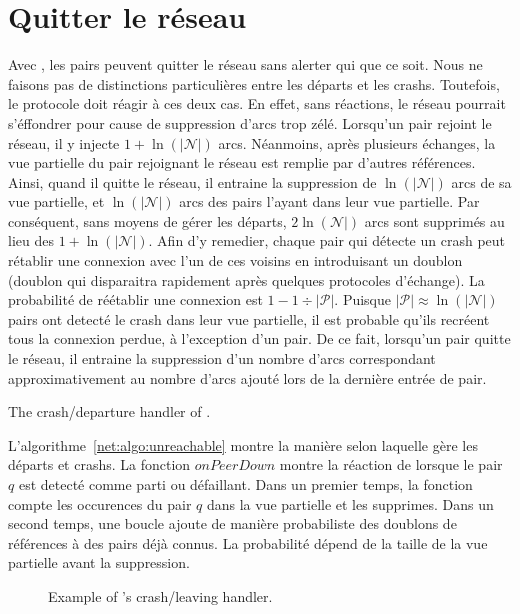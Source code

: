 \section{Quitter le réseau}

Avec \SPRAY, les pairs peuvent quitter le réseau sans alerter qui que ce
soit. Nous ne faisons pas de distinctions particulières entre les départs et les
crashs. Toutefois, le protocole doit réagir à ces deux cas. En effet, sans
réactions, le réseau pourrait s'éffondrer pour cause de suppression d'arcs trop
zélé. Lorsqu'un pair rejoint le réseau, il y injecte $1+\ln(|\mathcal{N}|)$
arcs. Néanmoins, après plusieurs échanges, la vue partielle du pair rejoignant
le réseau est remplie par d'autres références. Ainsi, quand il quitte le réseau,
il entraine la suppression de $\ln(|\mathcal{N}|)$ arcs de sa vue partielle, et
$\ln(|\mathcal{N}|)$ arcs des pairs l'ayant dans leur vue partielle. Par
conséquent, sans moyens de gérer les départs, $2\ln(\mathcal{N}|)$ arcs sont
supprimés au lieu des $1+\ln(|\mathcal{N}|)$. Afin d'y remedier, chaque pair qui
détecte un crash peut rétablir une connexion avec l'un de ces voisins en
introduisant un doublon (doublon qui disparaitra rapidement après quelques
protocoles d'échange). La probabilité de réétablir une connexion est
$1-1\div{|\mathcal{P}|}$. Puisque ${|\mathcal{P}|}\approx \ln(|\mathcal{N}|)$
pairs ont detecté le crash dans leur vue partielle, il est probable qu'ils
recréent tous la connexion perdue, à l'exception d'un pair. De ce fait,
lorsqu'un pair quitte le réseau, il entraine la suppression d'un nombre d'arcs
correspondant approximativement au nombre d'arcs ajouté lors de la dernière
entrée de pair.

\begin{algorithm}[h]
  
  \caption{\label{net:algo:unreachable}The crash/departure handler of \SPRAY.}
\end{algorithm}

L'algorithme~\ref{net:algo:unreachable} montre la manière selon laquelle \SPRAY
gère les départs et crashs. La fonction $onPeerDown$ montre la réaction de
\SPRAY lorsque le pair $q$ est detecté comme parti ou défaillant. Dans un
premier temps, la fonction compte les occurences du pair $q$ dans la vue
partielle et les supprimes. Dans un second temps, une boucle ajoute de manière
probabiliste des doublons de références à des pairs déjà connus. La probabilité
dépend de la taille de la vue partielle avant la suppression.

\begin{figure*}
  \centering
  \hspace{10pt}
  \hspace{10pt}
  \caption{\label{net:fig:crashexample}Example of \SPRAY's crash/leaving
    handler. }
\end{figure*}


